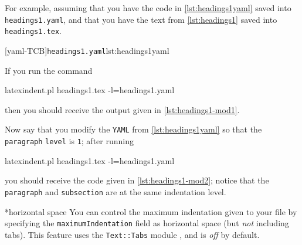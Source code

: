 \documentclass[10pt]{article}
\begin{document}
 \begin{example}
 For example, assuming that you have the code in \cref{lst:headings1yaml} saved into
 \texttt{headings1.yaml}, and that you have the text from \cref{lst:headings1} saved into
 \texttt{headings1.tex}.

 \begin{cmhtcbraster}
  [yaml-TCB]{\texttt{headings1.yaml}}{lst:headings1yaml}
 \end{cmhtcbraster}

 If you run the command 

 \begin{commandshell}
latexindent.pl headings1.tex -l=headings1.yaml
\end{commandshell}

 then you should receive the output given in \cref{lst:headings1-mod1}.

 \begin{minipage}{.45\textwidth}
 \end{minipage}%
 \hfill
 \begin{minipage}{.45\textwidth}
 \end{minipage}
 \end{example}

 Now say that you modify the \texttt{YAML} from \cref{lst:headings1yaml} so that the
 \texttt{paragraph} \texttt{level} is \texttt{1}; after running 

 \begin{commandshell}
latexindent.pl headings1.tex -l=headings1.yaml
\end{commandshell}

 you should receive the code given in \cref{lst:headings1-mod2}; notice that the
 \texttt{paragraph} and \texttt{subsection} are at the same indentation level.


*{horizontal space}
 You can control the maximum indentation given to your file by
  specifying the \texttt{maximumIndentation}
 field as horizontal space (but \emph{not} including tabs). This feature uses the
 \texttt{Text::Tabs} module \cite{texttabs}, and is \emph{off} by default.%
\end{document}
